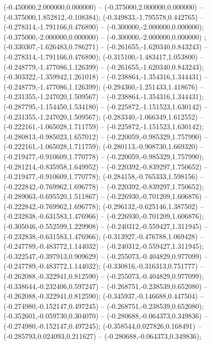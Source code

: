  (-0.450000,2.000000,0.000000) -- (-0.375000,2.000000,0.000000) -- (-0.375000,1.852812,-0.108384);
 (-0.349833,-1.795578,0.442765) -- (-0.278314,-1.791166,0.476890) -- (-0.300000,-2.000000,0.000000);
 (-0.375000,-2.000000,0.000000) -- (-0.300000,-2.000000,0.000000) ;
 (-0.330307,-1.626483,0.786271) -- (-0.261655,-1.620340,0.843243) -- (-0.278314,-1.791166,0.476890);
 (-0.315100,-1.483417,1.053800) -- (-0.248779,-1.477086,1.126399) -- (-0.261655,-1.620340,0.843243);
 (-0.303322,-1.359942,1.261018) -- (-0.238864,-1.354316,1.344431) -- (-0.248779,-1.477086,1.126399);
 (-0.294360,-1.251433,1.418676) -- (-0.231355,-1.247020,1.509567) -- (-0.238864,-1.354316,1.344431);
 (-0.287795,-1.154450,1.534180) -- (-0.225872,-1.151523,1.630142) -- (-0.231355,-1.247020,1.509567);
 (-0.283340,-1.066349,1.612552) -- (-0.222161,-1.065028,1.711759) -- (-0.225872,-1.151523,1.630142);
 (-0.280813,-0.985023,1.657012) -- (-0.220059,-0.985329,1.757990) -- (-0.222161,-1.065028,1.711759);
 (-0.280113,-0.908730,1.669320) -- (-0.219477,-0.910609,1.770778) -- (-0.220059,-0.985329,1.757990);
 (-0.281214,-0.835958,1.649952) -- (-0.220392,-0.839297,1.750652) -- (-0.219477,-0.910609,1.770778);
 (-0.284158,-0.765333,1.598156) -- (-0.222842,-0.769962,1.696778) -- (-0.220392,-0.839297,1.750652);
 (-0.289063,-0.695520,1.511867) -- (-0.226930,-0.701209,1.606876) -- (-0.222842,-0.769962,1.696778);
 (-0.296132,-0.625146,1.387502) -- (-0.232838,-0.631583,1.476966) -- (-0.226930,-0.701209,1.606876);
 (-0.305046,-0.552599,1.229908) -- (-0.240312,-0.559427,1.311945) -- (-0.232838,-0.631583,1.476966);
 (-0.313927,-0.476788,1.069428) -- (-0.247789,-0.483772,1.144032) -- (-0.240312,-0.559427,1.311945);
 (-0.322547,-0.397913,0.909629) -- (-0.255073,-0.404829,0.977099) -- (-0.247789,-0.483772,1.144032);
 (-0.330816,-0.316313,0.751777) -- (-0.262088,-0.322941,0.812590) -- (-0.255073,-0.404829,0.977099);
 (-0.338644,-0.232406,0.597247) -- (-0.268751,-0.238539,0.652080) -- (-0.262088,-0.322941,0.812590);
 (-0.345937,-0.146688,0.447504) -- (-0.274980,-0.152147,0.497245) -- (-0.268751,-0.238539,0.652080);
 (-0.352601,-0.059730,0.304070) -- (-0.280688,-0.064373,0.349836) -- (-0.274980,-0.152147,0.497245);
 (-0.358544,0.027826,0.168491) -- (-0.285793,0.024093,0.211627) -- (-0.280688,-0.064373,0.349836);
